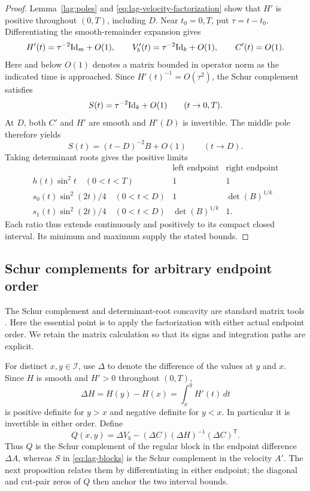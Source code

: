 \begin{proof}
Lemma~\ref{lag:poles} and \eqref{eq:lag-velocity-factorization} show
that $H'$ is positive throughout $(0,T)$, including $D$.  Near
$t_0=0,T$, put $\tau=t-t_0$.  Differentiating the smooth-remainder
expansion gives
\[
 H'(t)=\tau^{-2}\mathrm{Id}_m+O(1),\qquad
 V_b'(t)=\tau^{-2}\mathrm{Id}_k+O(1),\qquad C'(t)=O(1).
\]
Here and below $O(1)$ denotes a matrix bounded in operator norm as the
indicated time is approached.  Since $H'(t)^{-1}=O(\tau^2)$, the Schur
complement satisfies
\begin{equation}
 S(t)=\tau^{-2}\mathrm{Id}_k+O(1)\qquad(t\to0,T).
 \label{eq:lag-S-end}
\end{equation}
At $D$, both $C'$ and $H'$ are smooth and $H'(D)$ is invertible.  The
middle pole therefore yields
\begin{equation}
 S(t)=(t-D)^{-2}B+O(1)\qquad(t\to D).
 \label{eq:lag-S-middle}
\end{equation}
Taking determinant roots gives the positive limits
\[
 \begin{array}{c|cc}
 &\text{left endpoint}&\text{right endpoint}\\ \hline
 h(t)\sin^2t\quad(0<t<T)&1&1\\
 s_0(t)\sin^2(2t)/4\quad(0<t<D)&1&\det(B)^{1/k}\\
 s_1(t)\sin^2(2t)/4\quad(0<t<D)&\det(B)^{1/k}&1.
 \end{array}
\]
Each ratio thus extends continuously and positively to its compact
closed interval.  Its minimum and maximum supply the stated bounds.
\end{proof}

\subsection{Schur complements for arbitrary endpoint order}

The Schur complement and determinant-root concavity are standard
matrix tools \citep[Appendix~A.5.5 and Exercises~3.18(b), 3.26(b)]
{BoydVandenberghe2004}. Here the essential point is to apply the
factorization with either actual endpoint order. We retain the
matrix calculation so that its signs and integration paths are explicit.

For distinct $x,y\in\mathcal I$, use $\Delta$ to denote the difference
of the values at $y$ and $x$.  Since $H$ is smooth and $H'>0$ throughout
$(0,T)$,
\begin{equation}
 \Delta H=H(y)-H(x)=\int_x^y H'(t)\,dt
 \label{eq:lag-H-difference}
\end{equation}
is positive definite for $y>x$ and negative definite for $y<x$.
In particular it is invertible in either order.  Define
\begin{equation}
 Q(x,y)=\Delta V_b-(\Delta C)(\Delta H)^{-1}(\Delta C)^{\mathsf T}.
 \label{eq:lag-Q}
\end{equation}
Thus $Q$ is the Schur complement of the regular block in the endpoint
difference $\Delta A$, whereas $S$ in \eqref{eq:lag-blocks} is the
Schur complement in the velocity $A'$.  The next proposition relates
them by differentiating in either endpoint; the diagonal and cut-pair
zeros of $Q$ then anchor the two interval bounds.

